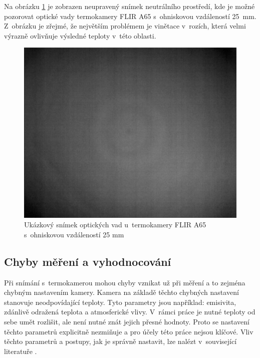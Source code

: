     Na obrázku \ref{fig:camera_2_lens_deffects} je zobrazen neupravený snímek neutrálního prostředí, kde je možné pozorovat optické vady termokamery FLIR A65 s~ohniskovou vzdáleností 25~mm. Z~obrázku je zřejmé, že největším problémem je vinětace v~rozích, která velmi výrazně ovlivňuje výsledné teploty v~této oblasti.
     
    \begin{figure}[h]
      \centering
      \includegraphics[width=1\textwidth]{images/camera_2_lens_deffects.jpg}
      \caption{Ukázkový snímek optických vad u~termokamery  FLIR A65 s~ohniskovou vzdáleností 25 mm}
      \label{fig:camera_2_lens_deffects}
    \end{figure}  

	\subsection{Chyby měření a vyhodnocování}
    Při snímání s~termokamerou mohou chyby vznikat už při měření a to zejména chybným nastavením kamery. Kamera na základě těchto chybných nastavení stanovuje neodpovídající teploty. Tyto parametry jsou například: emisivita, zdánlivě odražená teplota a atmosferické vlivy. V~rámci práce je nutné teploty od sebe umět rozlišit, ale není nutné znát jejich přesné hodnoty. Proto se nastavení těchto parametrů explicitně nezmiňuje a pro účely této práce nejsou klíčové. Vliv těchto parametrů a postupy, jak je správně nastavit, lze nalézt v~související literatuře \cite{flirA65Spec,puhl2015bezkontaktni,smrvz2013bezkontaktni,kuvzel2010bezkontaktni}.

